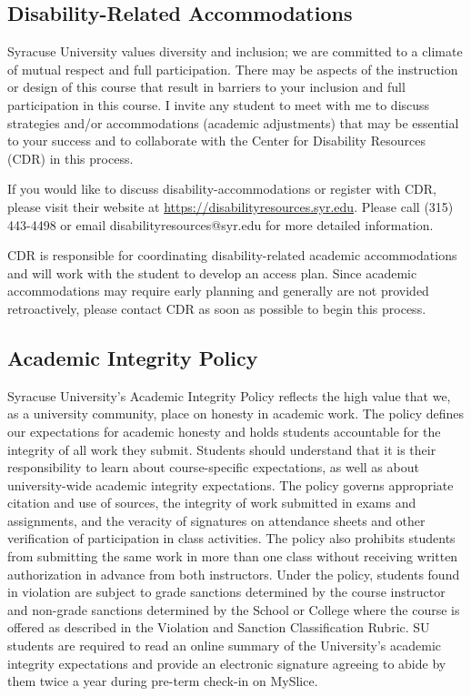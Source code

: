 \documentclass[12pt]{article}
\begin{document}
\subsection*{Disability-Related Accommodations}

Syracuse University values diversity and inclusion; we are committed to a climate of mutual respect and full participation.  There may be aspects of the instruction or design of this course that result in barriers to your inclusion and full participation in this course.  I invite any student to meet with me to discuss strategies and/or accommodations (academic adjustments) that may be essential to your success and to collaborate with the Center for Disability Resources (CDR) in this process.

If you would like to discuss disability-accommodations or register with CDR, please visit their website at \url{https://disabilityresources.syr.edu}. Please call (315) 443-4498 or email disabilityresources@syr.edu for more detailed information.

CDR is responsible for coordinating disability-related academic accommodations and will work with the student to develop an access plan. Since academic accommodations may require early planning and generally are not provided retroactively, please contact CDR as soon as possible to begin this process.

\subsection*{Academic Integrity Policy}

Syracuse University’s Academic Integrity Policy reflects the high value that we, as a university community, place on honesty in academic work. The policy defines our expectations for academic honesty and holds students accountable for the integrity of all work they submit. Students should understand that it is their responsibility to learn about course-specific expectations, as well as about university-wide academic integrity expectations. The policy governs appropriate citation and use of sources, the integrity of work submitted in exams and assignments, and the veracity of signatures on attendance sheets and other verification of participation in class activities. The policy also prohibits students from submitting the same work in more than one class without receiving written authorization in advance from both instructors. Under the policy, students found in violation are subject to grade sanctions determined by the course instructor and non-grade sanctions determined by the School or College where the course is offered as described in the Violation and Sanction Classification Rubric. SU students are required to read an online summary of the University’s academic integrity expectations and provide an electronic signature agreeing to abide by them twice a year during pre-term check-in on MySlice.
\end{document}
